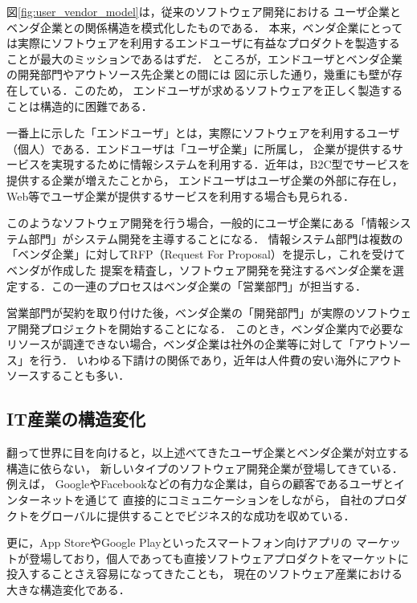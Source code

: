 \documentclass[a4j,9pt,twoside,twocolumn]{jsarticle}
\begin{document}
    図\ref{fig:user_vendor_model}は，従来のソフトウェア開発における
    ユーザ企業とベンダ企業との関係構造を模式化したものである．
    本来，ベンダ企業にとっては実際にソフトウェアを利用するエンドユーザに有益なプロダクトを製造する
    ことが最大のミッションであるはずだ．
    ところが，エンドユーザとベンダ企業の開発部門やアウトソース先企業との間には
    図に示した通り，幾重にも壁が存在している．このため，
    エンドユーザが求めるソフトウェアを正しく製造することは構造的に困難である．
    
    一番上に示した「エンドユーザ」とは，実際にソフトウェアを利用するユーザ（個人）である．エンドユーザは「ユーザ企業」に所属し，
    企業が提供するサービスを実現するために情報システムを利用する．近年は，B2C型でサービスを提供する企業が増えたことから，
    エンドユーザはユーザ企業の外部に存在し，Web等でユーザ企業が提供するサービスを利用する場合も見られる．
    
    このようなソフトウェア開発を行う場合，一般的にユーザ企業にある「情報システム部門」がシステム開発を主導することになる．
    情報システム部門は複数の「ベンダ企業」に対してRFP（Request For Proposal）を提示し，これを受けてベンダが作成した
    提案を精査し，ソフトウェア開発を発注するベンダ企業を選定する．この一連のプロセスはベンダ企業の「営業部門」が担当する．
    
    営業部門が契約を取り付けた後，ベンダ企業の「開発部門」が実際のソフトウェア開発プロジェクトを開始することになる．
    このとき，ベンダ企業内で必要なリソースが調達できない場合，ベンダ企業は社外の企業等に対して「アウトソース」を行う．
    いわゆる下請けの関係であり，近年は人件費の安い海外にアウトソースすることも多い．
    
    \subsection{IT産業の構造変化}

    翻って世界に目を向けると，以上述べてきたユーザ企業とベンダ企業が対立する構造に依らない，
    新しいタイプのソフトウェア開発企業が登場してきている．例えば，
    GoogleやFacebookなどの有力な企業は，自らの顧客であるユーザとインターネットを通じて
    直接的にコミュニケーションをしながら，
    自社のプロダクトをグローバルに提供することでビジネス的な成功を収めている．
    
    更に，App StoreやGoogle Playといったスマートフォン向けアプリの
    マーケットが登場しており，個人であっても直接ソフトウェアプロダクトをマーケットに投入することさえ容易になってきたことも，
    現在のソフトウェア産業における大きな構造変化である．
    
\end{document}
